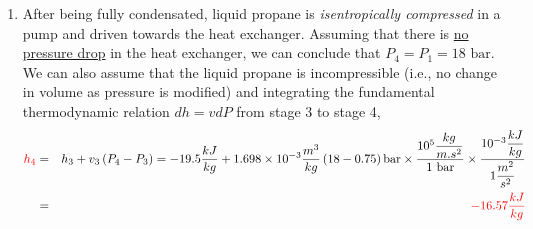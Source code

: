 \documentclass[12pts,a4paper,amsmath,amssymb,floatfix]{article}%
\newcommand{\frc}{\displaystyle\frac}
\newcommand{\red}{\textcolor{red}}
\begin{document}
\begin{enumerate}[label=\bfseries Stage \arabic*:]
\item After being fully condensated, liquid propane is {\it isentropically compressed} in a pump and driven towards the heat exchanger. Assuming that there is \underline{no pressure drop} in the heat exchanger, we can conclude that $P_{4}=P_{1}=18\text{ bar}$. We can also assume that the liquid propane is incompressible (i.e., no change in volume as pressure is modified) and integrating the fundamental thermodynamic relation $dh = vdP$ from stage 3 to stage 4,
\begin{eqnarray}
   \red{h_{4}} &=& h_{3} + v_{3}\left(P_{4}-P_{3}\right) = -19.5\frc{kJ}{kg} + 1.698\times 10^{-3}\frc{m^{3}}{kg}\left(18-0.75\right)\text{bar}\times \frc{10^{5}\frc{kg}{m.s^{2}}}{1\text{ bar}} \times \frc{10^{-3}\frc{kJ}{kg}}{1\frc{m^{2}}{s^{2}}}
 \nonumber \\
              &=& \red{-16.57\frc{kJ}{kg}} \nonumber
\end{eqnarray} 
%
\end{enumerate}
\end{document}
